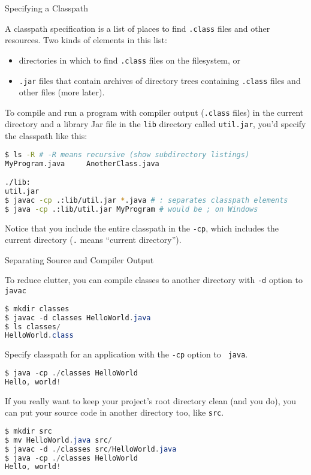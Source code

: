 \documentclass{beamer}
\begin{document}
\begin{frame}[fragile]{Specifying a Classpath}

\vspace{-.05in}
A classpath specification is a list of places to find {\tt .class} files and other resources.  Two kinds of elements in this list:

\begin{itemize}
\item directories in which to find {\tt .class} files on the filesystem, or
\item {\tt .jar} files that contain archives of directory trees containing {\tt .class} files and other files (more later).
\end{itemize}

To compile and run a program with compiler output ({\tt .class} files) in the current directory and a library Jar file in the {\tt lib} directory called {\tt util.jar}, you'd specify the classpath like this:
\vspace{-.05in}
\begin{lstlisting}[language=bash]
$ ls -R # -R means recursive (show subdirectory listings)
MyProgram.java     AnotherClass.java

./lib:
util.jar
$ javac -cp .:lib/util.jar *.java # : separates classpath elements
$ java -cp .:lib/util.jar MyProgram # would be ; on Windows
\end{lstlisting}
\vspace{-.05in}
Notice that you include the entire classpath in the {\tt -cp}, which includes the current directory ({\tt .} means ``current directory'').

\end{frame}

\begin{frame}[fragile]{Separating Source and Compiler Output}


To reduce clutter, you can compile classes to another directory with {\tt -d} option to {\tt javac}
\begin{lstlisting}[language=Java]
$ mkdir classes
$ javac -d classes HelloWorld.java
$ ls classes/
HelloWorld.class
\end{lstlisting}
Specify classpath for an application with the {\tt -cp} option to {\tt
  java}.
\begin{lstlisting}[language=Java]
$ java -cp ./classes HelloWorld
Hello, world!
\end{lstlisting}

If you really want to keep your project's root directory clean (and you do), you can put your source code in another directory too, like {\tt src}.
\begin{lstlisting}[language=Java]
$ mkdir src
$ mv HelloWorld.java src/
$ javac -d ./classes src/HelloWorld.java
$ java -cp ./classes HelloWorld
Hello, world!
\end{lstlisting}

\end{frame}
\end{document}
